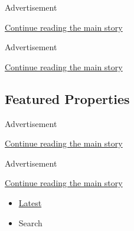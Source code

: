 Advertisement

\protect\hyperlink{after-feat1}{Continue reading the main story}

Advertisement

\protect\hyperlink{after-feat2}{Continue reading the main story}

\hypertarget{featured-properties-1}{%
\subsection{Featured Properties}\label{featured-properties-1}}

Advertisement

\protect\hyperlink{after-feat3}{Continue reading the main story}

Advertisement

\protect\hyperlink{after-feat4}{Continue reading the main story}

\begin{itemize}
\tightlist
\item
  \protect\hyperlink{stream-panel}{Latest}
\item
  Search
\end{itemize}

